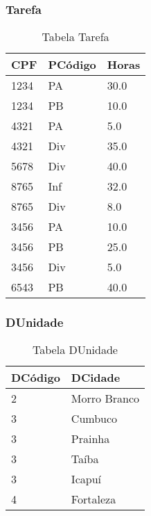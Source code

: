 \documentclass[a4paper,12pt]{article}
\begin{document}
\subsubsection*{Tarefa}
\begin{table}[h]
\centering
\caption{Tabela Tarefa}
\begin{tabular}{|l|l|l|}
\hline
\textbf{CPF} & \textbf{PCódigo} & \textbf{Horas} \\ \hline
1234         & PA               & 30.0            \\ \hline
1234         & PB               & 10.0            \\ \hline
4321         & PA               & 5.0             \\ \hline
4321         & Div              & 35.0            \\ \hline
5678         & Div              & 40.0            \\ \hline
8765         & Inf              & 32.0            \\ \hline
8765         & Div              & 8.0             \\ \hline
3456         & PA               & 10.0            \\ \hline
3456         & PB               & 25.0            \\ \hline
3456         & Div              & 5.0             \\ \hline
6543         & PB               & 40.0            \\ \hline
\end{tabular}
\end{table}

\subsubsection*{DUnidade}
\begin{table}[h]
\centering
\caption{Tabela DUnidade}
\begin{tabular}{|l|l|}
\hline
\textbf{DCódigo} & \textbf{DCidade} \\ \hline
2                & Morro Branco     \\ \hline
3                & Cumbuco          \\ \hline
3                & Prainha          \\ \hline
3                & Taíba            \\ \hline
3                & Icapuí           \\ \hline
4                & Fortaleza        \\ \hline
\end{tabular}
\end{table}
\end{document}
